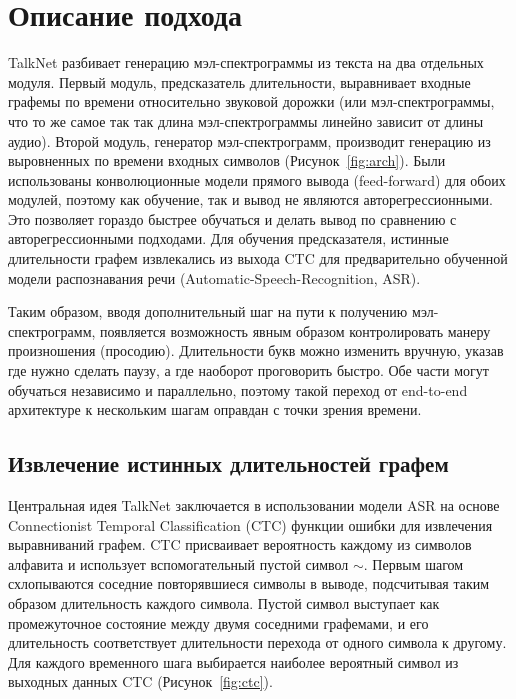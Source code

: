 \section{Описание подхода}

TalkNet разбивает генерацию мэл-спектрограммы из текста на два отдельных модуля. Первый модуль, предсказатель длительности, выравнивает входные графемы по времени относительно звуковой дорожки (или мэл-спектрограммы, что то же самое так так длина мэл-спектрограммы линейно зависит от длины аудио). Второй модуль, генератор мэл-спектрограмм, производит генерацию из выровненных по времени входных символов (Рисунок~\ref{fig:arch}). Были использованы конволюционные модели прямого вывода (feed-forward) для обоих модулей, поэтому как обучение, так и вывод не являются авторегрессионными. Это позволяет гораздо быстрее обучаться и делать вывод по сравнению с авторегрессионными подходами. Для обучения предсказателя, истинные длительности графем извлекались из выхода CTC для предварительно обученной модели распознавания речи (Automatic-Speech-Recognition, ASR).

Таким образом, вводя дополнительный шаг на пути к получению мэл-спектро\-грамм, появляется возможность явным образом контролировать манеру произношения (просодию). Длительности букв можно изменить вручную, указав где нужно сделать паузу, а где наоборот проговорить быстро. Обе части могут обучаться независимо и параллельно, поэтому такой переход от end-to-end архитектуре к нескольким шагам оправдан с точки зрения времени.

\subsection{Извлечение истинных длительностей графем}

Центральная идея TalkNet заключается в использовании модели ASR на основе Connectionist Temporal Classification (CTC) функции ошибки для извлечения выравниваний графем. CTC присваивает вероятность каждому из символов алфавита и использует вспомогательный пустой символ $\sim$. Первым шагом схлопываются соседние повторявшиеся символы в выводе, подсчитывая таким образом длительность каждого символа. Пустой символ выступает как промежуточное состояние между двумя соседними графемами, и его длительность соответствует длительности перехода от одного символа к другому. Для каждого временного шага выбирается наиболее вероятный символ из выходных данных CTC (Рисунок~\ref{fig:ctc}).

